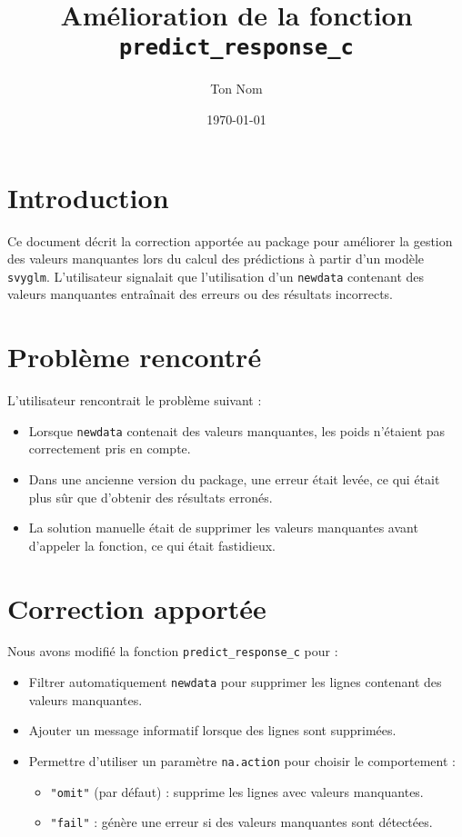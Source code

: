 \documentclass{article}
\title{Amélioration de la fonction \texttt{predict\_response\_c}}
\author{Ton Nom}
\date{\today}
\begin{document}


\maketitle

\section{Introduction}
Ce document décrit la correction apportée au package pour améliorer la gestion des valeurs manquantes lors du calcul des prédictions à partir d'un modèle \texttt{svyglm}.
L'utilisateur signalait que l'utilisation d'un \texttt{newdata} contenant des valeurs manquantes entraînait des erreurs ou des résultats incorrects.

\section{Problème rencontré}
L'utilisateur rencontrait le problème suivant :
\begin{itemize}
  \item Lorsque \texttt{newdata} contenait des valeurs manquantes, les poids n'étaient pas correctement pris en compte.
  \item Dans une ancienne version du package, une erreur était levée, ce qui était plus sûr que d'obtenir des résultats erronés.
  \item La solution manuelle était de supprimer les valeurs manquantes avant d'appeler la fonction, ce qui était fastidieux.
\end{itemize}

\section{Correction apportée}
Nous avons modifié la fonction \texttt{predict\_response\_c} pour :
\begin{itemize}
  \item Filtrer automatiquement \texttt{newdata} pour supprimer les lignes contenant des valeurs manquantes.
  \item Ajouter un message informatif lorsque des lignes sont supprimées.
  \item Permettre d'utiliser un paramètre \texttt{na.action} pour choisir le comportement :
    \begin{itemize}
      \item \texttt{"omit"} (par défaut) : supprime les lignes avec valeurs manquantes.
      \item \texttt{"fail"} : génère une erreur si des valeurs manquantes sont détectées.
    \end{itemize}
\end{itemize}
\end{document}
